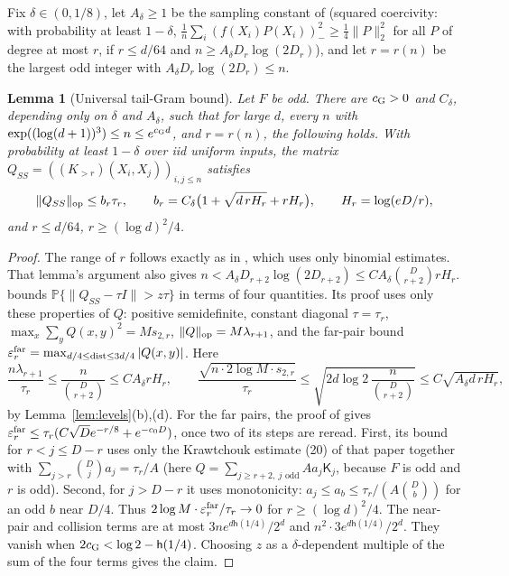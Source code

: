 \documentclass[11pt]{article}
\newtheorem{lemma}[theorem]{Lemma}
\theoremstyle{definition}\newtheorem{assumption}[theorem]{Assumption}
\theoremstyle{remark}\newtheorem{remark}[theorem]{Remark}
\DeclareMathOperator{\dist}{dist}
\newcommand{\Pp}{\mathbb P}
\begin{document}
Fix $\delta\in(0,1/8)$, let $A_\delta\ge1$ be the sampling constant of
\cite[Lemma~4.4]{subcritical} (squared coercivity: with probability at
least $1-\delta$, $\frac1n\sum_i(f(X_i)P(X_i))_-^2\ge\frac14\|P\|_2^2$
for all $P$ of degree at most $r$, if $r\le d/64$ and
$n\ge A_\delta D_r\log(2D_r)$), and let $r=r(n)$ be the largest odd integer
with $A_\delta D_r\log(2D_r)\le n$.

\begin{lemma}[Universal tail-Gram bound]\label{lem:gram}
Let $F$ be odd. There are $c_{\rm G}>0$ and $C_\delta$, depending only on
$\delta$ and $A_\delta$, such that for large $d$, every $n$ with
$\exp((\log(d+1))^3)\le n\le e^{c_{\rm G}d}$, and $r=r(n)$, the following holds.
With probability at least $1-\delta$ over iid uniform inputs, the matrix
$Q_{SS}=((K_{>r})(X_i,X_j))_{i,j\le n}$ satisfies
\[
 \|Q_{SS}\|_{\rm op}\le b_r\tau_r,\qquad
 b_r=C_\delta\bigl(1+\sqrt{d\,rH_r}+rH_r\bigr),\qquad H_r=\log(eD/r),
\]
and $r\le d/64$, $r\ge(\log d)^2/4$.
\end{lemma}
\begin{proof}
The range of $r$ follows exactly as in \cite[Lemma~6.4]{subcritical}, which
uses only binomial estimates. That lemma's argument also gives
$n<A_\delta D_{r+2}\log(2D_{r+2})\le CA_\delta\binom D{r+2}rH_r$.
\cite[Lemma~5.2]{subcritical} bounds
$\Pp\{\|Q_{SS}-\tau I\|>z\tau\}$ in terms of four quantities. Its proof
uses only these properties of $Q$: positive semidefinite, constant diagonal
$\tau=\tau_r$, $\max_x\sum_yQ(x,y)^2=Ms_{2,r}$, $\|Q\|_{\rm op}=M\lambda_{r+1}$,
and the far-pair bound $\varepsilon^{\rm far}_r=\max_{d/4\le\dist\le3d/4}|Q(x,y)|$. Here
\[
 \frac{n\lambda_{r+1}}{\tau_r}\le\frac n{\binom D{r+2}}\le CA_\delta rH_r,
 \qquad
 \frac{\sqrt{n\cdot2\log M\cdot s_{2,r}}}{\tau_r}
 \le\sqrt{2d\log2\,\frac n{\binom D{r+2}}}\le C\sqrt{A_\delta d\,rH_r},
\]
by Lemma~\ref{lem:levels}(b),(d). For the far pairs, the proof of
\cite[Lemma~5.1]{subcritical} gives
$\varepsilon^{\rm far}_r\le\tau_r(C\sqrt De^{-r/8}+e^{-c_0D})$, once two of its steps are
reread. First, its bound for $r<j\le D-r$ uses only the Krawtchouk estimate
(20) of that paper together with $\sum_{j>r}\binom Dja_j=\tau_r/A$ (here
$Q=\sum_{j\ge r+2,\ j\text{ odd}}Aa_j\mathsf K_j$, because $F$ is odd and
$r$ is odd). Second, for $j>D-r$ it uses monotonicity:
$a_j\le a_{b}\le\tau_r/(A\binom Db)$ for an odd $b$ near $D/4$. Thus
$2\log M\cdot\varepsilon^{\rm far}_r/\tau_r\to0$ for $r\ge(\log d)^2/4$. The near-pair and
collision terms are at most $3ne^{d\mathsf h(1/4)}/2^d$ and
$n^2\cdot3e^{d\mathsf h(1/4)}/2^d$. They vanish when
$2c_{\rm G}<\log2-\mathsf h(1/4)$. Choosing $z$ as a $\delta$-dependent multiple
of the sum of the four terms gives the claim.
\end{proof}
\end{document}
